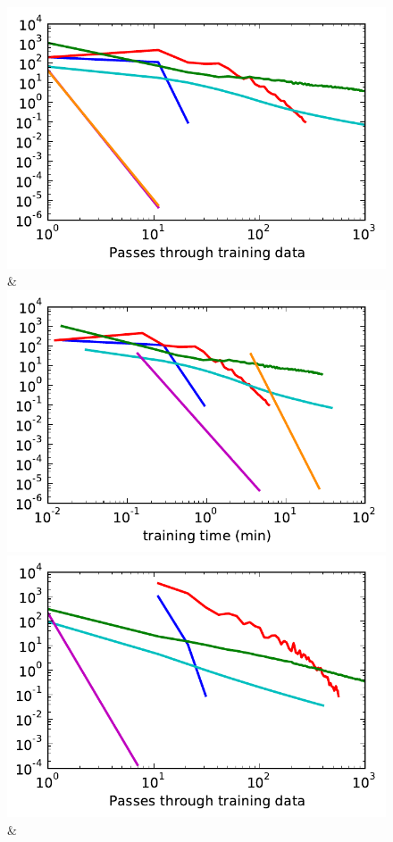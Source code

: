 \begin{figure}
\begin{tabu}
    \includegraphics[width=\linewidth]{evaluation/images/scene_full_log}&%
    \includegraphics[width=\linewidth]{evaluation/images/scene_full_log_time}\\
    \includegraphics[width=\linewidth]{evaluation/images/yeast_tree_log}&%

\end{tabu}
\end{figure}
